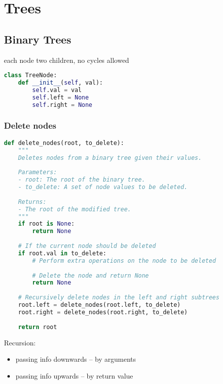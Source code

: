 \documentclass[english, threecolumn]{latex4ei/latex4ei_sheet}
\begin{document}
\section{Trees}
\begin{sectionbox}
\subsection{Binary Trees}
each node two children, no cycles allowed
\begin{lstlisting}[language=python, gobble=0]
class TreeNode:
    def __init__(self, val):
        self.val = val
        self.left = None
        self.right = None
\end{lstlisting}

\subsubsection{Delete nodes}
\begin{lstlisting}[language=python, gobble=0]
def delete_nodes(root, to_delete):
    """
    Deletes nodes from a binary tree given their values.
    
    Parameters:
    - root: The root of the binary tree.
    - to_delete: A set of node values to be deleted.
    
    Returns:
    - The root of the modified tree.
    """
    if root is None:
        return None
    
    # If the current node should be deleted
    if root.val in to_delete:
        # Perform extra operations on the node to be deleted
        
        # Delete the node and return None
        return None
    
    # Recursively delete nodes in the left and right subtrees
    root.left = delete_nodes(root.left, to_delete)
    root.right = delete_nodes(root.right, to_delete)
    
    return root
\end{lstlisting}
\end{sectionbox}

Recursion:
\begin{itemize}
    \item passing info downwards -- by arguments
    \item passing info upwards -- by return value
\end{itemize}
\end{document}
